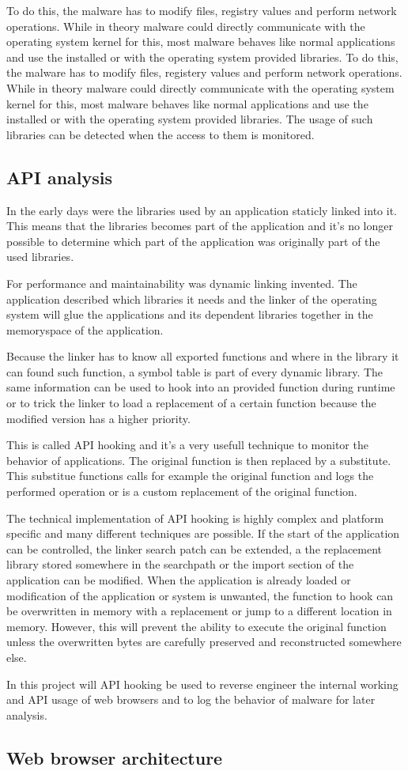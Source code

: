 To do this, the malware has to modify files, registry values  and perform network operations. While in theory malware could directly communicate with the operating system kernel for this, most malware behaves like normal applications and use the installed or with the operating system provided libraries.
To do this, the malware has to modify files, registery values and perform network operations. While in theory malware could directly communicate with the operating system kernel for this, most malware behaves like normal applications and use the installed or with the operating system provided libraries. The usage of such libraries can be detected when the access to them is monitored.

\subsection{API analysis}

In the early days were the libraries used by an application staticly linked into it. This means that the libraries becomes part of the application and it's no longer possible to determine which part of the application was originally part of the used libraries.

For performance and maintainability was dynamic linking invented. The application described which libraries it needs and the linker of the operating system will glue the applications and its dependent libraries together in the memoryspace of the application. 

Because the linker has to know all exported functions and where in the library it can found such function, a symbol table is part of every dynamic library. The same information can be used to hook into an provided function during runtime or to trick the linker to load a replacement of a certain function because the modified version has a higher priority.

This is called API hooking\cite{} and it's a very usefull technique to monitor the behavior of applications. The original function is then replaced by a substitute. This substitue functions calls for example the original function and logs the performed operation or is a custom replacement of the original function.

The technical implementation of API hooking is highly complex and platform specific and many different techniques\cite{http://jbremer.org/x86-api-hooking-demystified/} are possible. If the start of the application can be controlled, the linker search patch can be extended, a the replacement library stored somewhere in the searchpath or the import section of the application can be modified. When the application is already loaded or modification of the application or system is unwanted, the function to hook can be overwritten in memory with a replacement or jump to a different location in memory. However, this will prevent the ability to execute the original function unless the overwritten bytes are carefully preserved and reconstructed somewhere else.

In this project will API hooking be used to reverse engineer the internal working and API usage of web browsers and to log the behavior of malware for later analysis.

\subsection{Web browser architecture}

